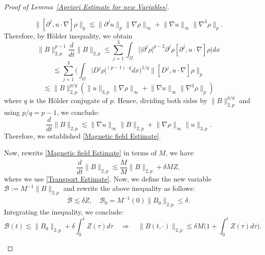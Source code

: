 \documentclass[12pt,letterpaper]{article}
\theoremstyle{plain}
\begin{document}
\begin{proof}[Proof of Lemma~\ref{Apriori Estimate for new Variables}]
\begin{itemize}
\begin{equation}
       \lVert[\partial^j,u\cdot\nabla] \rho  \rVert_{p}\lesssim \lVert \partial^j u\rVert_p\lVert \nabla\rho\rVert_\infty+\lVert\nabla u\rVert_\infty \lVert \nabla^3\rho\rVert_p.
    \end{equation}
Therefore, by H\"older inequality, we obtain
\begin{equation*}
 \lVert B\rVert_{2,p}^{p-1}\frac{d}{dt} \lVert B\rVert_{2,p}\le   \sum_{j=1}^3\int_\Omega \Big\lvert \lvert \partial^j \rho\rvert^{p-2}\partial^j\rho  [\partial^j,u\cdot\nabla] \rho \Big\rvert dx  
\end{equation*}
\begin{equation*}
 \lesssim    \sum_{j=1}^3\Big(\int_\Omega\lvert D^j\rho\rvert^{(p-1)\cdot q} dx\Big)^{1/q}\lVert[D^j,u\cdot\nabla] \rho  \rVert_{p}
\end{equation*}
\begin{equation*}
  \lesssim  \lVert B\rVert_{2,p}^{p/q}(\lVert u\rVert_{3,p}\lVert \nabla\rho\rVert_\infty+\lVert\nabla u\rVert_\infty \lVert \nabla^3\rho\rVert_p)
\end{equation*}
where $q$ is the H\"older conjugate of $p$. Hence, dividing both sides by $\lVert B\rVert_{2,p}^{p/q}$ and using $p/q=p-1$, we conclude: 
\begin{equation*}
 \frac{d}{dt} \lVert B\rVert_{2,p}\lesssim \lVert\nabla u\rVert_\infty \lVert B\rVert_{2,p}+ \lVert\nabla\rho\rVert_\infty\lVert u\rVert_{3,p}.  
\end{equation*}
   Therefore, we established \eqref{Magnetic field Estimate}.

   Now, rewrite \eqref{Magnetic field Estimate} in terms of $M$, we have
   \begin{equation*}
    \frac{d}{dt}  \lVert B\rVert_{2,p}\lesssim \frac{\dot M}{M}\lVert B\rVert_{2,p}+\delta MZ,
   \end{equation*}
   where we use  \eqref{Transport Estimate}. Now, we define the new variable $\mathcal B:=M^{-1}\lVert B\rVert_{2,p}$ and rewrite the above inequality as follows:
   \begin{equation*}
     \dot{\mathcal B}\lesssim \delta Z,\quad \mathcal B_0=M^{-1}(0)\lVert B_0\rVert_{2,p}\le \delta.
   \end{equation*}
   Integrating the inequality, we conclude:
   \begin{equation*}
    \mathcal B(t)\lesssim \lVert B_0\rVert_{2,p}+ \delta\int_0^tZ(\tau)d\tau\quad\Longrightarrow\quad  \lVert B(t,\cdot)\rVert_{2,p}\lesssim \delta M\bigg(1+\int_0^tZ(\tau)d\tau\bigg).
   \end{equation*}


\end{itemize}
\end{proof}
\end{document}
